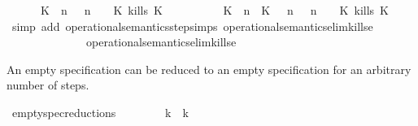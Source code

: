 \begin{isabellebody}
\ \ \ \ {\isasymsupseteq}\ {\isacharbraceleft}\ {\isacharparenleft}{\isacharparenleft}K\ {\isasymnot}{\isasymUp}\ n{\isacharparenright}\ {\isacharhash}\ {\isasymGamma}{\isacharparenright}{\isacharcomma}\ n\ {\isasymturnstile}\ {\isasymPsi}\ {\isasymtriangleright}\ {\isacharparenleft}{\isacharparenleft}K\ kills\ K\ {\isacharhash}\ {\isasymPhi}{\isacharparenright}{\isacharcomma}\isanewline
\ \ \ \ \ \ \ \ {\isacharparenleft}{\isacharparenleft}K\ {\isasymUp}\ n{\isacharparenright}\ {\isacharhash}\ {\isacharparenleft}K\ {\isasymnot}{\isasymUp}\ {\isasymge}\ n{\isacharparenright}\ {\isacharhash}\ {\isasymGamma}{\isacharparenright}{\isacharcomma}\ n\ {\isasymturnstile}\ {\isasymPsi}\ {\isasymtriangleright}\ {\isacharparenleft}{\isacharparenleft}K\ kills\ K\ {\isacharhash}\ {\isasymPhi}{\isacharparenright}\ {\isacharbraceright}{\isacartoucheclose}\isanewline
%
\isadelimproof
%
\endisadelimproof
%
\isatagproof
{}\isamarkupfalse%
\ {\isacharparenleft}simp\ add{\isacharcolon}\ operational{\isacharunderscore}semantics{\isacharunderscore}step{\isachardot}simps\ operational{\isacharunderscore}semantics{\isacharunderscore}elim{\isachardot}kills{\isacharunderscore}e{}\isanewline
\ \ \ \ \ \ \ \ \ \ \ \ \ \ operational{\isacharunderscore}semantics{\isacharunderscore}elim{\isachardot}kills{\isacharunderscore}e{}{\isacharparenright}%
\endisatagproof
{\isafoldproof}%
%
\isadelimproof
%
\endisadelimproof
%
\begin{isamarkuptext}%
An empty specification can be reduced to an empty specification for 
  an arbitrary number of steps.%
\end{isamarkuptext}\isamarkuptrue%
\isamarkupfalse%
\ empty{\isacharunderscore}spec{\isacharunderscore}reductions{\isacharcolon}\isanewline
\ \ {\isacartoucheopen}{\isacharparenleft}{\isacharbrackleft}{\isacharbrackright}{\isacharcomma}\ {}\ {\isasymturnstile}\ {\isacharbrackleft}{\isacharbrackright}\ {\isasymtriangleright}\ {\isacharbrackleft}{\isacharbrackright}{\isacharparenright}\ {\isasymhookrightarrow}\isactrlbsup k\isactrlesup \ {\isacharparenleft}{\isacharbrackleft}{\isacharbrackright}{\isacharcomma}\ k\ {\isasymturnstile}\ {\isacharbrackleft}{\isacharbrackright}\ {\isasymtriangleright}\ {\isacharbrackleft}{\isacharbrackright}{\isacharparenright}{\isacartoucheclose}\isanewline
%

\end{isabellebody}
